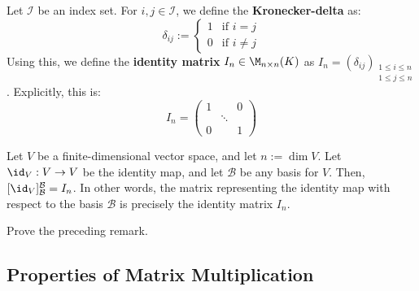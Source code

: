 Let $\mathcal{I}$ be an index set. For $i, j \in \mathcal{I}$, we define the \textbf{Kronecker-delta} as:
\begin{equation*}
    \delta_{ij} := \begin{cases} 1 & \text{if } i = j \\ 0 & \text{if } i \neq j \end{cases}
\end{equation*}
Using this, we define the \textbf{identity matrix} $I_n \in \M_{n \times n}(K)$ as $I_n = (\delta_{ij})_{\substack{1 \le i \le n \\ 1 \le j \le n}}$. Explicitly, this is:
\begin{equation*}
    I_n = \begin{pmatrix} 1 & & 0 \\ & \ddots & \\ 0 & & 1 \end{pmatrix}
\end{equation*}

\begin{remark}
Let $V$ be a finite-dimensional vector space, and let $n := \dim V$. Let $\id_V: V \to V$ be the identity map, and let $\mathcal{B}$ be any basis for $V$. Then, $[\id_V]_{\mathcal{B}}^{\mathcal{B}} = I_n$. In other words, the matrix representing the identity map with respect to the basis $\mathcal{B}$ is precisely the identity matrix $I_n$.
\end{remark}

\begin{exercise}
Prove the preceding remark.
\end{exercise}

\subsection{Properties of Matrix Multiplication}

